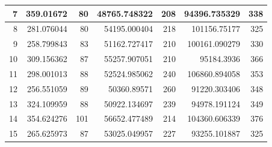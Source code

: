 \begin{table}
\begin{adjustwidth}{}{}
{{\begin{tabular}{|r|r|r|r|r|r|r|}
\hline
7                                          & 359.01672                    & 80                                    & 48765.748322                   & 208                                   & 94396.735329                 & 338                                    \\ 
\hline
8                                          & 281.076044                   & 80                                    & 54195.000404                   & 218                                   & 101156.75177                 & 325                                    \\ 
\hline
9                                          & 258.799843                   & 83                                    & 51162.727417                   & 210                                   & 100161.090279                & 330                                    \\ 
\hline
10                                         & 309.156362                   & 87                                    & 55257.907051                   & 210                                   & 95184.3936                   & 366                                    \\ 
\hline
11                                         & 298.001013                   & 88                                    & 52524.985062                   & 240                                   & 106860.894058                & 353                                    \\ 
\hline
12                                         & 256.551059                   & 89                                    & 50360.89571                    & 260                                   & 91220.303406                 & 348                                    \\ 
\hline
13                                         & 324.109959                   & 88                                    & 50922.134697                   & 239                                   & 94978.191124                 & 349                                    \\ 
\hline
14                                         & 354.624276                   & 101                                   & 56652.477489                   & 214                                   & 104360.606339                & 376                                    \\ 
\hline
15                                         & 265.625973                   & 87                                    & 53025.049957                   & 227                                   & 93255.101887                 & 325                                    \\ 

\end{tabular}}}
\end{adjustwidth}
\end{table}
